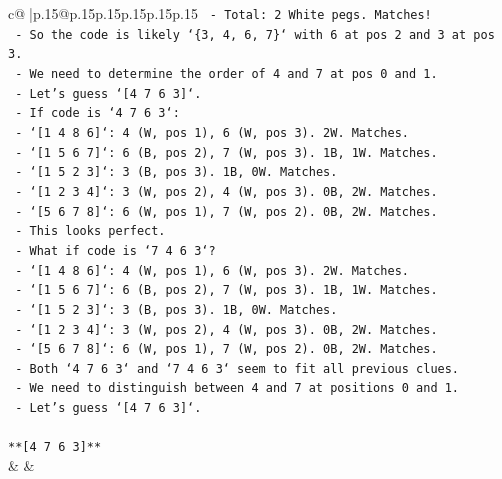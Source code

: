 \documentclass{article}
\begin{document}
{\begin{supertabular}{c@{$\;$}|p{.15\linewidth}@{}p{.15\linewidth}p{.15\linewidth}p{.15\linewidth}p{.15\linewidth}p{.15\linewidth}}
{{{\texttt{        {-} Total: 2 White pegs. Matches!} \\
\texttt{    {-} So the code is likely `\{3, 4, 6, 7\}` with 6 at pos 2 and 3 at pos 3.} \\
\texttt{    {-} We need to determine the order of 4 and 7 at pos 0 and 1.} \\
\texttt{    {-} Let's guess `{[}4 7 6 3{]}`.} \\
\texttt{        {-} If code is `4 7 6 3`:} \\
\texttt{            {-} `{[}1 4 8 6{]}`: 4 (W, pos 1), 6 (W, pos 3). 2W. Matches.} \\
\texttt{            {-} `{[}1 5 6 7{]}`: 6 (B, pos 2), 7 (W, pos 3). 1B, 1W. Matches.} \\
\texttt{            {-} `{[}1 5 2 3{]}`: 3 (B, pos 3). 1B, 0W. Matches.} \\
\texttt{            {-} `{[}1 2 3 4{]}`: 3 (W, pos 2), 4 (W, pos 3). 0B, 2W. Matches.} \\
\texttt{            {-} `{[}5 6 7 8{]}`: 6 (W, pos 1), 7 (W, pos 2). 0B, 2W. Matches.} \\
\texttt{        {-} This looks perfect.} \\
\texttt{    {-} What if code is `7 4 6 3`?} \\
\texttt{        {-} `{[}1 4 8 6{]}`: 4 (W, pos 1), 6 (W, pos 3). 2W. Matches.} \\
\texttt{        {-} `{[}1 5 6 7{]}`: 6 (B, pos 2), 7 (W, pos 3). 1B, 1W. Matches.} \\
\texttt{        {-} `{[}1 5 2 3{]}`: 3 (B, pos 3). 1B, 0W. Matches.} \\
\texttt{        {-} `{[}1 2 3 4{]}`: 3 (W, pos 2), 4 (W, pos 3). 0B, 2W. Matches.} \\
\texttt{        {-} `{[}5 6 7 8{]}`: 6 (W, pos 1), 7 (W, pos 2). 0B, 2W. Matches.} \\
\texttt{    {-} Both `4 7 6 3` and `7 4 6 3` seem to fit all previous clues.} \\
\texttt{    {-} We need to distinguish between 4 and 7 at positions 0 and 1.} \\
\texttt{    {-} Let's guess `{[}4 7 6 3{]}`.} \\
\\ 
\texttt{**{[}4 7 6 3{]}**} \\
            }
        }
    }
    & & \\ \\


\end{supertabular}}
\end{document}
